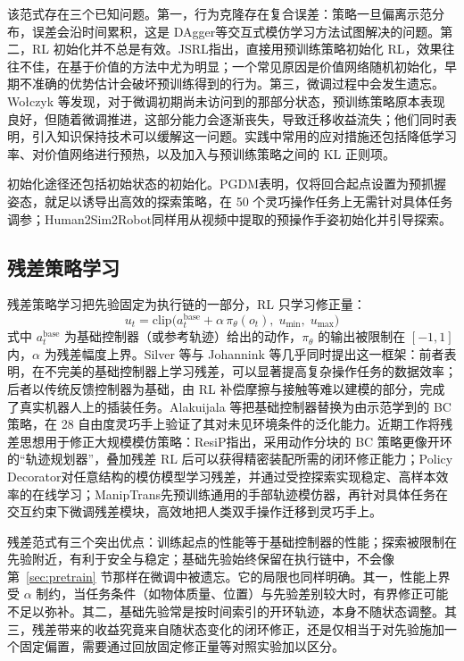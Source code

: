 \documentclass[UTF8,a4paper,zihao=-4]{ctexart}
\begin{document}
该范式存在三个已知问题。第一，行为克隆存在复合误差：策略一旦偏离示范分布，误差会沿时间累积，这是 DAgger\cite{dagger}等交互式模仿学习方法试图解决的问题。第二，RL 初始化并不总是有效。JSRL\cite{jsrl}指出，直接用预训练策略初始化 RL，效果往往不佳，在基于价值的方法中尤为明显；一个常见原因是价值网络随机初始化，早期不准确的优势估计会破坏预训练得到的行为。第三，微调过程中会发生遗忘。Wołczyk 等\cite{wolczyk}发现，对于微调初期尚未访问到的那部分状态，预训练策略原本表现良好，但随着微调推进，这部分能力会逐渐丧失，导致迁移收益流失；他们同时表明，引入知识保持技术可以缓解这一问题。实践中常用的应对措施还包括降低学习率、对价值网络进行预热，以及加入与预训练策略之间的 KL 正则项。

初始化途径还包括初始状态的初始化。PGDM\cite{pgdm}表明，仅将回合起点设置为预抓握姿态，就足以诱导出高效的探索策略，在 50 个灵巧操作任务上无需针对具体任务调参；Human2Sim2Robot\cite{human2sim2robot}同样用从视频中提取的预操作手姿初始化并引导探索。

\subsection{残差策略学习}\label{sec:residual}

残差策略学习把先验固定为执行链的一部分，RL 只学习修正量：
\begin{equation}\label{eq:residual}
  u_{t}=\mathrm{clip}\big(a^{\mathrm{base}}_{t}+\alpha\,\pi_{\theta}(o_{t}),\;u_{\min},\;u_{\max}\big)
\end{equation}
式中 $a^{\mathrm{base}}_t$ 为基础控制器（或参考轨迹）给出的动作，$\pi_\theta$ 的输出被限制在 $[-1,1]$ 内，$\alpha$ 为残差幅度上界。Silver 等\cite{rpl}与 Johannink 等\cite{johannink}几乎同时提出这一框架：前者表明，在不完美的基础控制器上学习残差，可以显著提高复杂操作任务的数据效率；后者以传统反馈控制器为基础，由 RL 补偿摩擦与接触等难以建模的部分，完成了真实机器人上的插装任务。Alakuijala 等\cite{alakuijala}把基础控制器替换为由示范学到的 BC 策略，在 28 自由度灵巧手上验证了其对未见环境条件的泛化能力。近期工作将残差思想用于修正大规模模仿策略：ResiP\cite{resip}指出，采用动作分块的 BC 策略更像开环的“轨迹规划器”，叠加残差 RL 后可以获得精密装配所需的闭环修正能力；Policy Decorator\cite{policydecorator}对任意结构的模仿模型学习残差，并通过受控探索实现稳定、高样本效率的在线学习；ManipTrans\cite{maniptrans}先预训练通用的手部轨迹模仿器，再针对具体任务在交互约束下微调残差模块，高效地把人类双手操作迁移到灵巧手上。

残差范式有三个突出优点：训练起点的性能等于基础控制器的性能；探索被限制在先验附近，有利于安全与稳定；基础先验始终保留在执行链中，不会像第~\ref{sec:pretrain} 节那样在微调中被遗忘。它的局限也同样明确。其一，性能上界受 $\alpha$ 制约，当任务条件（如物体质量、位置）与先验差别较大时，有界修正可能不足以弥补。其二，基础先验常是按时间索引的开环轨迹，本身不随状态调整。其三，残差带来的收益究竟来自随状态变化的闭环修正，还是仅相当于对先验施加一个固定偏置，需要通过回放固定修正量等对照实验加以区分。
\end{document}
